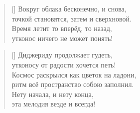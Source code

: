 \documentclass[14pt]{memoir}
\begin{document}
\newpage

\begin{verse}[\versewidth]
Вокруг облака бесконечно, и снова,\\
точкой становятся, затем и сверхновой.\\
Время летит то вперёд, то назад,\\
утконос ничего не может понять!
\end{verse}

\BgThispage


\vspace{12cm}
\begin{verse}[\versewidth]
Диджериду продолжает гудеть,\\
утконосу от радости хочется петь!\\
Космос раскрылся как цветок на ладони,\\
ритм всё пространство собою заполнил.\\
Нету начала, и нету конца,\\
эта мелодия везде и всегда!
\end{verse}
\newpage
\end{document}
